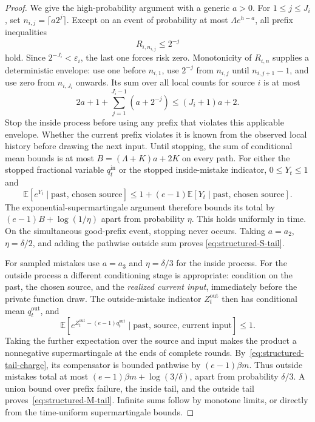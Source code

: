 \begin{proof}
We give the high-probability argument with a generic $a>0$. For
$1\le j\le J_i$, set $n_{i,j}=\lceil a2^j\rceil$. Except on an event of
probability at most $\Lambda e^{h-a}$, all prefix inequalities
\[
 R_{i,n_{i,j}}\le2^{-j}
\]
hold. Since $2^{-J_i}<\varepsilon_i$, the last one forces risk zero.
Monotonicity of $R_{i,n}$ supplies a deterministic envelope: use one
before $n_{i,1}$, use $2^{-j}$ from $n_{i,j}$ until $n_{i,j+1}-1$, and
use zero from $n_{i,J_i}$ onwards. Its sum over all local counts for
source $i$ is at most
\[
 2a+1+\sum_{j=1}^{J_i-1}(a+2^{-j})
 \le(J_i+1)a+2.
\]
Stop the inside process before using any prefix that violates this
applicable envelope. Whether the current prefix violates it is known
from the observed local history before drawing the next input. Until
stopping, the sum of conditional mean bounds is at most
$B=(\Lambda+K)a+2K$ on every path. For either the stopped fractional
variable $q_t^{\mathrm{in}}$ or the stopped inside-mistake indicator,
$0\le Y_t\le1$ and
\[
 \mathbb E[e^{Y_t}\mid\text{past, chosen source}]
 \le 1+(e-1)\mathbb E[Y_t\mid\text{past, chosen source}].
\]
The exponential-supermartingale argument therefore bounds its total by
$(e-1)B+\log(1/\eta)$ apart from probability $\eta$. This holds uniformly
in time. On the simultaneous good-prefix event, stopping never occurs.
Taking $a=a_2$, $\eta=\delta/2$, and adding the pathwise outside sum proves
\eqref{eq:structured-S-tail}.

For sampled mistakes use $a=a_3$ and $\eta=\delta/3$ for the inside
process. For the outside process a different conditioning stage is
appropriate: condition on the past, the chosen source, and the
\emph{realized current input}, immediately before the private function
draw. The outside-mistake indicator $Z_t^{\mathrm{out}}$ then has
conditional mean $q_t^{\mathrm{out}}$, and
\[
 \mathbb E\!\left[
 e^{Z_t^{\mathrm{out}}-(e-1)q_t^{\mathrm{out}}}
 \mid\text{past, source, current input}\right]\le1.
\]
Taking the further expectation over the source and input makes the
product a nonnegative supermartingale at the ends of complete rounds.
By~\eqref{eq:structured-tail-charge}, its compensator is bounded
pathwise by $(e-1)\beta m$. Thus outside mistakes total at most
$(e-1)\beta m+\log(3/\delta)$, apart from probability $\delta/3$.
A union bound over prefix failure, the inside tail, and the outside tail
proves~\eqref{eq:structured-M-tail}. Infinite sums follow by monotone
limits, or directly from the time-uniform supermartingale bounds.
\end{proof}

